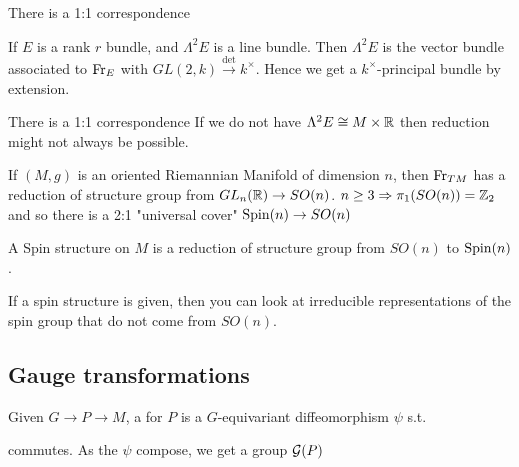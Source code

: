 \documentclass{article}
\begin{document}
\begin{prop}
There is a 1:1 correspondence 
\end{prop}

\begin{example}
If $E$ is a rank $r$ bundle, and $\Lambda^2 E$ is a line bundle. Then $\Lambda^2 E$ is the vector bundle associated to $\operatorname{Fr}_E$ with $GL(2,k) \overset{\det}{\to} k^\times$. Hence we get a $k^\times$-principal bundle by extension. 
\end{example}

\begin{example}
There is a 1:1 correspondence 
If we do not have $\Lambda^2 E \cong M \times \mathbb{R}$ then reduction might not always be possible. 
\end{example}


\begin{example}
If $(M,g)$ is an oriented Riemannian Manifold of dimension $n$, then $\operatorname{Fr}_{TM}$ has a reduction of structure group from $GL_n(\mathbb{R}) \to SO(n)$. $ n \geq 3 \Rightarrow \pi_1(SO(n)) = \mathbb{Z}_2$ and so there is a 2:1 "universal cover" $\operatorname{Spin}(n) \to SO(n)$
\end{example}

\begin{definition}
A Spin structure on $M$ is a reduction of structure group from $SO(n)$ to $\operatorname{Spin}(n)$. 
\end{definition}

If a spin structure is given, then you can look at irreducible representations of the spin group that do not come from $SO(n)$. 


\subsection{Gauge transformations}

\begin{definition}
Given $G \to P \to M$, a  for $P$ is a $G$-equivariant diffeomorphism $\psi$ s.t. 

\begin{center}
\end{center}
commutes. As the $\psi$ compose, we get a group $\mathcal{G}(P)$
\end{definition}
\end{document}
